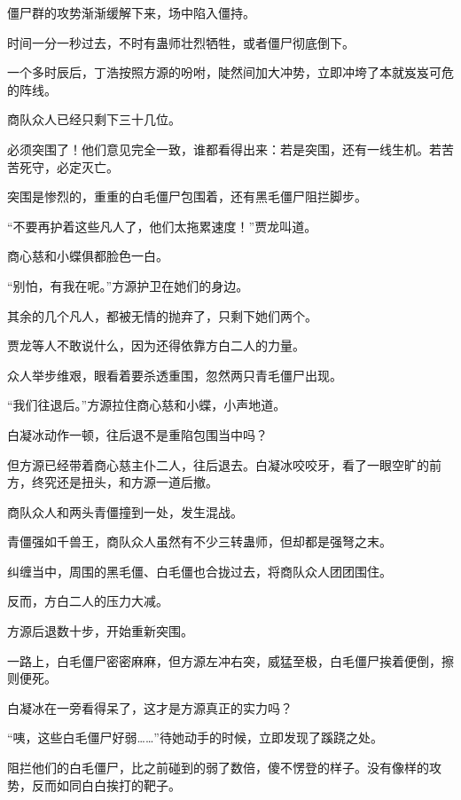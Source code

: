 
\begin{this_body}



僵尸群的攻势渐渐缓解下来，场中陷入僵持。

时间一分一秒过去，不时有蛊师壮烈牺牲，或者僵尸彻底倒下。

一个多时辰后，丁浩按照方源的吩咐，陡然间加大冲势，立即冲垮了本就岌岌可危的阵线。

商队众人已经只剩下三十几位。

必须突围了！他们意见完全一致，谁都看得出来：若是突围，还有一线生机。若苦苦死守，必定灭亡。

突围是惨烈的，重重的白毛僵尸包围着，还有黑毛僵尸阻拦脚步。

“不要再护着这些凡人了，他们太拖累速度！”贾龙叫道。

商心慈和小蝶俱都脸色一白。

“别怕，有我在呢。”方源护卫在她们的身边。

其余的几个凡人，都被无情的抛弃了，只剩下她们两个。

贾龙等人不敢说什么，因为还得依靠方白二人的力量。

众人举步维艰，眼看着要杀透重围，忽然两只青毛僵尸出现。

“我们往退后。”方源拉住商心慈和小蝶，小声地道。

白凝冰动作一顿，往后退不是重陷包围当中吗？

但方源已经带着商心慈主仆二人，往后退去。白凝冰咬咬牙，看了一眼空旷的前方，终究还是扭头，和方源一道后撤。

商队众人和两头青僵撞到一处，发生混战。

青僵强如千兽王，商队众人虽然有不少三转蛊师，但却都是强弩之末。

纠缠当中，周围的黑毛僵、白毛僵也合拢过去，将商队众人团团围住。

反而，方白二人的压力大减。

方源后退数十步，开始重新突围。

一路上，白毛僵尸密密麻麻，但方源左冲右突，威猛至极，白毛僵尸挨着便倒，擦则便死。

白凝冰在一旁看得呆了，这才是方源真正的实力吗？

“咦，这些白毛僵尸好弱……”待她动手的时候，立即发现了蹊跷之处。

阻拦他们的白毛僵尸，比之前碰到的弱了数倍，傻不愣登的样子。没有像样的攻势，反而如同白白挨打的靶子。


\end{this_body}

